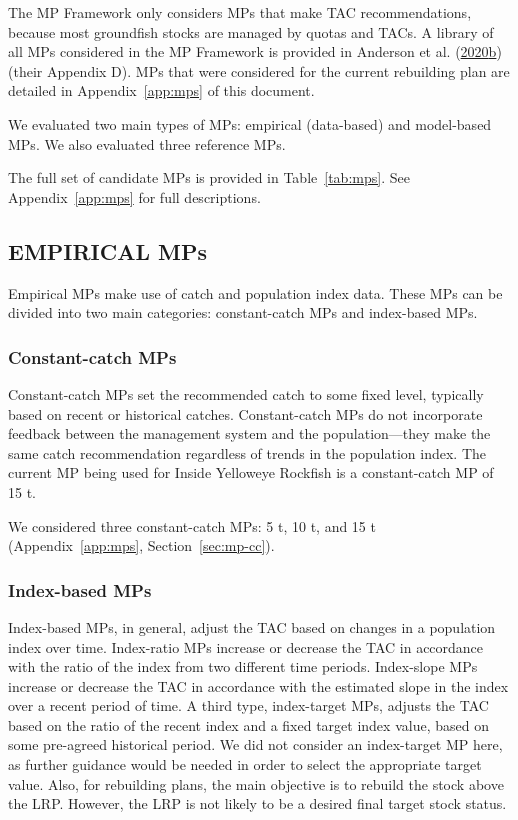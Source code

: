 \documentclass[11pt]{book}
\begin{document}
The MP Framework only considers MPs that make TAC recommendations, because most groundfish stocks are managed by quotas and TACs. A library of all MPs considered in the MP Framework is provided in Anderson et al. (\protect\hyperlink{ref-anderson2020gfmp}{2020}\protect\hyperlink{ref-anderson2020gfmp}{b}) (their Appendix D). MPs that were considered for the current rebuilding plan are detailed in Appendix~\ref{app:mps} of this document.

We evaluated two main types of MPs: empirical (data-based) and model-based MPs. We also evaluated three reference MPs.

The full set of candidate MPs is provided in Table~\ref{tab:mps}. See Appendix~\ref{app:mps} for full descriptions.

\hypertarget{empirical-mps}{%
\subsection{EMPIRICAL MPs}\label{empirical-mps}}

Empirical MPs make use of catch and population index data. These MPs can be divided into two main categories: constant-catch MPs and index-based MPs.

\hypertarget{constant-catch-mps}{%
\subsubsection{Constant-catch MPs}\label{constant-catch-mps}}

Constant-catch MPs set the recommended catch to some fixed level, typically based on recent or historical catches. Constant-catch MPs do not incorporate feedback between the management system and the population---they make the same catch recommendation regardless of trends in the population index. The current MP being used for Inside Yelloweye Rockfish is a constant-catch MP of 15 t.

We considered three constant-catch MPs: 5 t, 10 t, and 15 t (Appendix~\ref{app:mps}, Section~\ref{sec:mp-cc}).

\hypertarget{index-based-mps}{%
\subsubsection{Index-based MPs}\label{index-based-mps}}

Index-based MPs, in general, adjust the TAC based on changes in a population index over time. Index-ratio MPs increase or decrease the TAC in accordance with the ratio of the index from two different time periods. Index-slope MPs increase or decrease the TAC in accordance with the estimated slope in the index over a recent period of time. A third type, index-target MPs, adjusts the TAC based on the ratio of the recent index and a fixed target index value, based on some pre-agreed historical period. We did not consider an index-target MP here, as further guidance would be needed in order to select the appropriate target value. Also, for rebuilding plans, the main objective is to rebuild the stock above the LRP. However, the LRP is not likely to be a desired final target stock status.
\end{document}
